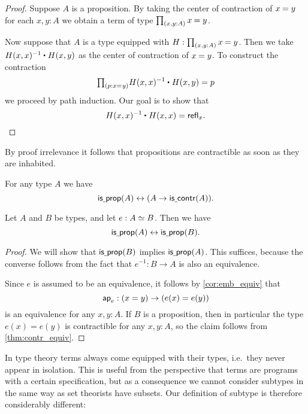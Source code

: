 \begin{proof}
Suppose $A$ is a proposition. By taking the center of contraction of $\id{x}{y}$ for each $x,y:A$ we obtain a term of type $\prd{x,y:A}\id{x}{y}$.

Now suppose that $A$ is a type equipped with $H:\prd{x,y:A}\id{x}{y}$. Then we take $\ct{H(x,x)^{-1}}{H(x,y)}$ as the center of contraction of $\id{x}{y}$. To construct the contraction
\begin{equation*}
\prd{p:\id{x}{y}} \ct{H(x,x)^{-1}}{H(x,y)}=p
\end{equation*}
we proceed by path induction. Our goal is to show that
\begin{equation*}
\ct{H(x,x)^{-1}}{H(x,x)}=\refl{x}.\qedhere
\end{equation*}
\end{proof}

By proof irrelevance it follows that propositions are contractible as soon as they are inhabited.

\begin{cor}\label{cor:contr_prop}
For any type $A$ we have
\begin{equation*}
\mathsf{is\underline{\ }{}prop}(A)\leftrightarrow (A\to\mathsf{is\underline{\ }{}contr}(A)).
\end{equation*}
\end{cor}

\begin{lem}\label{lem:prop_equiv}
Let $A$ and $B$ be types, and let $e:\eqv{A}{B}$. Then we have
\begin{equation*}
\mathsf{is\underline{\ }{}prop}(A)\leftrightarrow\mathsf{is\underline{\ }{}prop}(B).
\end{equation*}
\end{lem}

\begin{proof}
We will show that $\mathsf{is\underline{\ }{}prop}(B)$ implies $\mathsf{is\underline{\ }{}prop}(A)$. This suffices, because the converse follows from the fact that $e^{-1}:B\to A$ is also an equivalence. 

Since $e$ is assumed to be an equivalence, it follows by \cref{cor:emb_equiv} that
\begin{equation*}
\mathsf{ap}_{e} : (x=y)\to (e(x)=e(y))
\end{equation*}
is an equivalence for any $x,y:A$. If $B$ is a proposition, then in particular the type $e(x)=e(y)$ is contractible for any $x,y:A$, so the claim follows from \cref{thm:contr_equiv}.
\end{proof}

In type theory terms always come equipped with their types, i.e.~they never appear in isolation. This is useful from the perspective that terms are programs with a certain specification, but as a consequence we cannot consider subtypes in the same way as set theorists have subsets. Our definition of subtype is therefore considerably different:

